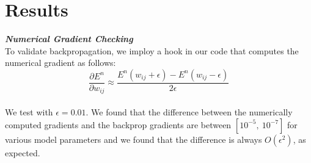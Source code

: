 \documentclass{article} %
\begin{document}
\section*{Results}

\textbf{\textit{Numerical Gradient Checking}} \\ 

To validate backpropagation, we imploy a hook in our code that computes the numerical gradient as follows: $$\frac{\partial E^n}{\partial w_{ij}} \approx \frac{E^n(w_{ij} + \epsilon) - E^n(w_{ij} - \epsilon)}{2\epsilon}$$ \\ 

We test with $\epsilon = 0.01$.  We found that the difference between the numerically computed gradients and the backprop gradients are between $[10^{-5}, \ 10^{-7}]$ for various model parameters and we found that the difference is always $O(\epsilon^2)$, as expected. \\
\end{document}
